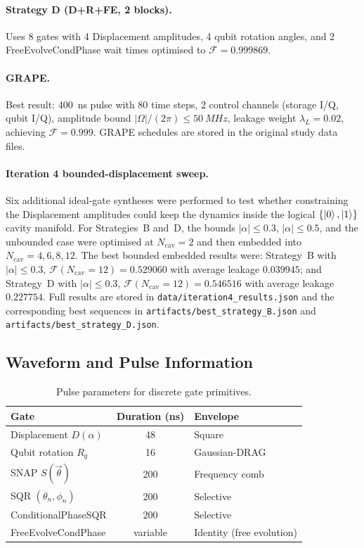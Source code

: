\documentclass[aps,pra,twocolumn,reprint,floatfix,amsmath,amssymb]{revtex4-2}
\begin{document}
\paragraph{Strategy D (D+R+FE, 2 blocks).}
Uses 8 gates with 4 Displacement amplitudes, 4 qubit rotation
angles, and 2 FreeEvolveCondPhase wait times optimised to
$\mathcal{F}=0.999869$.

\paragraph{GRAPE.}
Best result: \SI{400}{ns} pulse with 80 time steps, 2 control
channels (storage I/Q, qubit I/Q), amplitude bound
$|\Omega|/(2\pi)\leq\SI{50}{MHz}$, leakage weight
$\lambda_L=0.02$, achieving $\mathcal{F}=0.999$.
GRAPE schedules are stored in the original study data files.

\paragraph{Iteration 4 bounded-displacement sweep.}
Six additional ideal-gate syntheses were performed to test whether
constraining the Displacement amplitudes could keep the dynamics
inside the logical $\{\ket{0},\ket{1}\}$ cavity manifold.
For Strategies~B and~D, the bounds $|\alpha|\leq 0.3$,
$|\alpha|\leq 0.5$, and the unbounded case were optimised at
$N_\mathrm{cav}=2$ and then embedded into $N_\mathrm{cav}=4,6,8,12$.
The best bounded embedded results were:
Strategy~B with $|\alpha|\leq 0.3$,
$\mathcal{F}(N_\mathrm{cav}=12)=0.529060$ with average leakage
$0.039945$; and Strategy~D with $|\alpha|\leq 0.3$,
$\mathcal{F}(N_\mathrm{cav}=12)=0.546516$ with average leakage
$0.227754$.  Full results are stored in
\texttt{data/iteration4\_results.json} and the corresponding best
sequences in \texttt{artifacts/best\_strategy\_B.json} and
\texttt{artifacts/best\_strategy\_D.json}.

\subsection{Waveform and Pulse Information}

\begin{table}[h]
  \centering
  \caption{Pulse parameters for discrete gate primitives.}
  \label{tab:pulse_info}
  \begin{tabular}{@{} l S[table-format=3] l @{}}
    \toprule
    Gate & {Duration (ns)} & Envelope \\
    \midrule
    Displacement $D(\alpha)$ & 48 & Square \\
    Qubit rotation $R_q$ & 16 & Gaussian-DRAG \\
    SNAP $S(\vec\theta)$ & 200 & Frequency comb \\
    SQR $(\theta_n,\phi_n)$ & 200 & Selective \\
    ConditionalPhaseSQR & 200 & Selective \\
    FreeEvolveCondPhase & {variable} & Identity (free evolution) \\
    \bottomrule
  \end{tabular}
\end{table}
\end{document}
